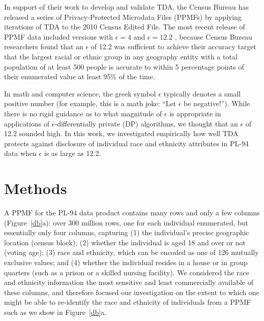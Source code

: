 \documentclass{article}
\begin{document}
In support of their work to develop and validate TDA,  the Census Bureau has released a series of Privacy-Protected Microdata Files (PPMFs) by applying iterations of TDA to the 2010 Census Edited File.  The most recent release of PPMF data included versions with $\epsilon=4$ and $\epsilon=12.2$ \cite{census2021developing}, because
Census Bureau researchers found that an $\epsilon$ of 12.2 was sufficient to achieve their accuracy target that the largest racial or ethnic group in any geography entity with a total population of at least 500 people is accurate to within 5 percentage points of their enumerated value at least 95\% of the time.

In math and computer science, the greek symbol $\epsilon$ typically denotes a small positive number (for example, this is a math joke: ``Let $\epsilon$ be negative!'').  While there is no rigid guidance as to what magnitude of $\epsilon$ is appropriate in applications of $\epsilon$-differentially private (DP) algorithms, we thought that an $\epsilon$ of 12.2 sounded high. In this work, we investigated empirically how well TDA protects against disclosure of individual race and ethnicity attributes in PL-94 data when $\epsilon$ is as large as 12.2.

\section{Methods}
A PPMF for the PL-94 data product contains many rows and only a few columns (Figure~\ref{db}a): over 300 million rows, one for each individual enumerated, but essentially only four columns, capturing (1) the individual's precise geographic location (census block); (2) whether the individual is aged 18 and over or not (voting age); (3) race and ethnicity, which can be encoded as one of 126 mutually exclusive values; and (4) whether the individual resides in a house or in group quarters (such as a prison or a skilled nursing facility).  We considered the race and ethnicity information the most sensitive and least commercially available of these columns, and therefore focused our investigation on the extent to which one might be able to re-identify the race and ethnicity of individuals from a PPMF such as we show in Figure~\ref{db}a.
\end{document}

